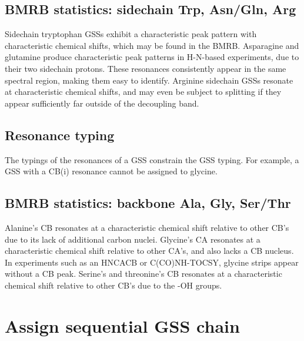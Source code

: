 \subsection*{BMRB statistics: sidechain Trp, Asn/Gln, Arg}
Sidechain tryptophan GSSs exhibit a characteristic peak pattern with 
characteristic chemical shifts, which may be found in the BMRB.
Asparagine and glutamine produce characteristic peak patterns in H-N-based 
experiments, due to their two sidechain protons.  These resonances consistently
appear in the same spectral region, making them easy to identify.
Arginine sidechain GSSs resonate at characteristic chemical shifts, and may
even be subject to splitting if they appear sufficiently far outside of the
decoupling band.

\subsection*{Resonance typing}
The typings of the resonances of a GSS constrain the GSS typing.  For example,
a GSS with a CB(i) resonance cannot be assigned to glycine.

\subsection*{BMRB statistics: backbone Ala, Gly, Ser/Thr}
Alanine's CB resonates at a characteristic chemical shift relative to other 
CB's due to its lack of additional carbon nuclei.
Glycine's CA resonates at a characteristic chemical shift relative to other
CA's, and also lacks a CB nucleus.  In experiments such as an HNCACB or 
C(CO)NH-TOCSY, glycine strips appear without a CB peak.
Serine's and threonine's CB resonates at a characteristic chemical shift 
relative to other CB's due to the -OH groups.



\section*{Assign sequential GSS chain}

